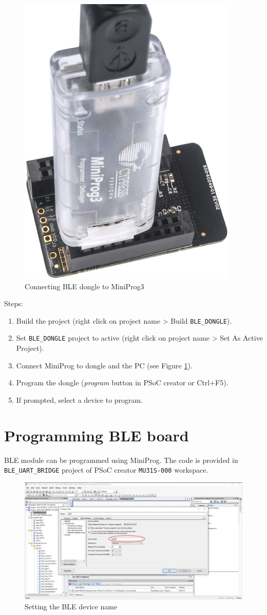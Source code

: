 \begin{figure}[htb]
    \centering
	  \includegraphics[width=0.25\linewidth]{figures/dongle_miniprog.jpg}
	\caption{Connecting BLE dongle to MiniProg3}
	\label{fig:dongle_prog}
\end{figure}

Steps:
\begin{enumerate}
	\item Build the project (right click on project name > Build \texttt{BLE\_DONGLE}).
	\item Set \texttt{BLE\_DONGLE} project to active (right click on project name > Set As Active Project).
	\item Connect MiniProg to dongle and the PC (see Figure \ref{fig:dongle_prog}).
	\item Program the dongle (\textit{program} button in PSoC creator or Ctrl+F5).
	\item If prompted, select a device to program.
\end{enumerate}

\section{Programming BLE board}

BLE module can be programmed using MiniProg. The code is provided in \texttt{BLE\_UART\_BRIDGE} project of PSoC creator \texttt{MU31S-000} workspace.

\begin{figure}[htb]
    \centering
	  \includegraphics[width=\linewidth]{figures/BLE_device_name.PNG}
	\caption{Setting the BLE device name}
	\label{fig:ble_device_name}
\end{figure}

